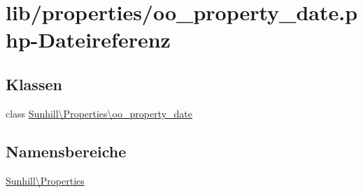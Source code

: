 \hypertarget{oo__property__date_8php}{}\section{lib/properties/oo\+\_\+property\+\_\+date.php-\/\+Dateireferenz}
\label{oo__property__date_8php}
\subsection*{Klassen}
\begin{DoxyCompactItemize}
\item 
class \hyperlink{classSunhill_1_1Properties_1_1oo__property__date}{Sunhill\textbackslash{}\+Properties\textbackslash{}oo\+\_\+property\+\_\+date}
\end{DoxyCompactItemize}
\subsection*{Namensbereiche}
\begin{DoxyCompactItemize}
\item 
 \hyperlink{namespaceSunhill_1_1Properties}{Sunhill\textbackslash{}\+Properties}
\end{DoxyCompactItemize}
